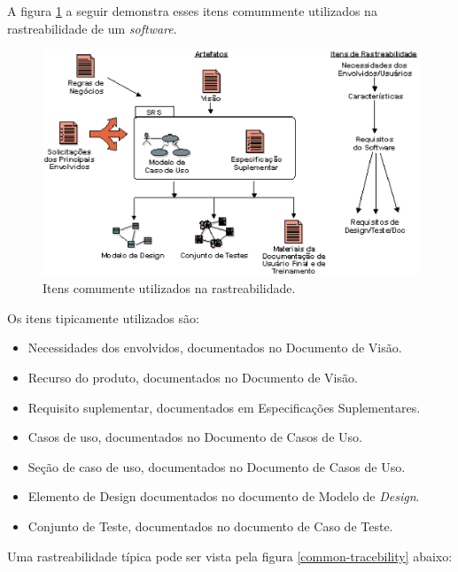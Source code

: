 A figura \ref{common-itens} a seguir demonstra esses itens comummente utilizados na rastreabilidade de um \textit{software}.

\begin{figure}[htb]
\centering
  \includegraphics[keepaspectratio=true,scale=0.7]
  {figuras/itens_comuns.eps}
  \caption{Itens comumente utilizados na rastreabilidade.~\cite{rup1}}
  \label{common-itens}
\end{figure}

\clearpage{}


Os itens tipicamente utilizados são:

\begin{itemize}
\item Necessidades dos envolvidos, documentados no Documento de Visão.
\item Recurso do produto, documentados no Documento de Visão.
\item Requisito suplementar, documentados em Especificações Suplementares.
\item Casos de uso, documentados no Documento de Casos de Uso.
\item Seção de caso de uso, documentados no Documento de Casos de Uso.
\item Elemento de Design documentados no documento de Modelo de \textit{Design}.
\item Conjunto de Teste, documentados no documento de Caso de Teste.
\end{itemize}

Uma rastreabilidade típica pode ser vista pela figura \ref{common-tracebility} abaixo:

